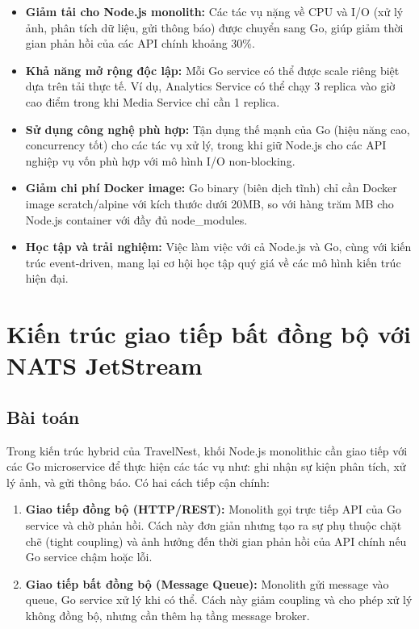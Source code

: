 \documentclass[13pt,a4paper,twoside]{report}
\begin{document}
\begin{itemize}
  \item \textbf{Giảm tải cho Node.js monolith:} Các tác vụ nặng về CPU và I/O (xử lý ảnh, phân tích dữ liệu, gửi thông báo) được chuyển sang Go, giúp giảm thời gian phản hồi của các API chính khoảng 30\%.
  \item \textbf{Khả năng mở rộng độc lập:} Mỗi Go service có thể được scale riêng biệt dựa trên tải thực tế. Ví dụ, Analytics Service có thể chạy 3 replica vào giờ cao điểm trong khi Media Service chỉ cần 1 replica.
  \item \textbf{Sử dụng công nghệ phù hợp:} Tận dụng thế mạnh của Go (hiệu năng cao, concurrency tốt) cho các tác vụ xử lý, trong khi giữ Node.js cho các API nghiệp vụ vốn phù hợp với mô hình I/O non-blocking.
  \item \textbf{Giảm chi phí Docker image:} Go binary (biên dịch tĩnh) chỉ cần Docker image scratch/alpine với kích thước dưới 20MB, so với hàng trăm MB cho Node.js container với đầy đủ node\_modules.
  \item \textbf{Học tập và trải nghiệm:} Việc làm việc với cả Node.js và Go, cùng với kiến trúc event-driven, mang lại cơ hội học tập quý giá về các mô hình kiến trúc hiện đại.
\end{itemize}

\section{Kiến trúc giao tiếp bất đồng bộ với NATS JetStream}

\subsection{Bài toán}

Trong kiến trúc hybrid của TravelNest, khối Node.js monolithic cần giao tiếp với các Go microservice để thực hiện các tác vụ như: ghi nhận sự kiện phân tích, xử lý ảnh, và gửi thông báo. Có hai cách tiếp cận chính:

\begin{enumerate}
  \item \textbf{Giao tiếp đồng bộ (HTTP/REST):} Monolith gọi trực tiếp API của Go service và chờ phản hồi. Cách này đơn giản nhưng tạo ra sự phụ thuộc chặt chẽ (tight coupling) và ảnh hưởng đến thời gian phản hồi của API chính nếu Go service chậm hoặc lỗi.
  \item \textbf{Giao tiếp bất đồng bộ (Message Queue):} Monolith gửi message vào queue, Go service xử lý khi có thể. Cách này giảm coupling và cho phép xử lý không đồng bộ, nhưng cần thêm hạ tầng message broker.
\end{enumerate}
\end{document}
